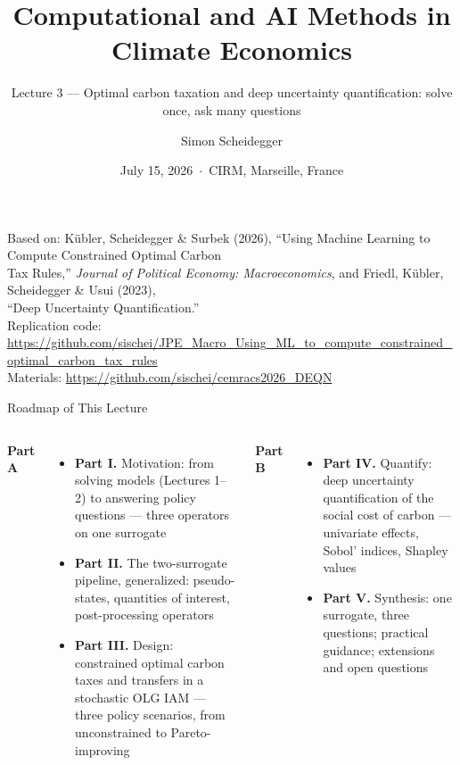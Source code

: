 \documentclass[aspectratio=169,11pt]{beamer}
\title[CEMRACS 2026 $\cdot$ Optimal Taxation \& Deep UQ]
{Computational and AI Methods in Climate Economics}
\subtitle{Lecture 3 --- Optimal carbon taxation and deep uncertainty quantification: solve once, ask many questions}
\author{Simon Scheidegger}
\institute[HEC Lausanne]{HEC Lausanne $\cdot$ Grantham Research Institute, LSE}
\date{July 15, 2026 \,$\cdot$\, CIRM, Marseille, France}
\newcommand{\emphc}[1]{\textcolor{harvardcrimson}{#1}}
\begin{document}

{
\begin{frame}
\titlepage
\vspace{-0.75cm}
\begin{center}
{\scriptsize Based on: K\"ubler, Scheidegger \& Surbek (2026), ``Using Machine Learning to Compute Constrained Optimal Carbon\\
Tax Rules,'' \emph{Journal of Political Economy: Macroeconomics}, and Friedl, K\"ubler, Scheidegger \& Usui (2023),\\
``Deep Uncertainty Quantification.''}\\[3pt]
{\scriptsize Replication code: \url{https://github.com/sischei/JPE_Macro_Using_ML_to_compute_constrained_optimal_carbon_tax_rules}}\\[2pt]
{\scriptsize Materials: \url{https://github.com/sischei/cemracs2026_DEQN}}
\end{center}
\end{frame}
}

\begin{frame}{Roadmap of This Lecture}
\vspace{0.2em}
\begin{columns}[T]
\textbf{Part A}
\begin{itemize}
    \item \textbf{Part I.} Motivation: from solving models (Lectures 1--2) to answering policy questions --- three operators on one surrogate
    \item \textbf{Part II.} The two-surrogate pipeline, generalized: pseudo-states, quantities of interest, post-processing operators
    \item \textbf{Part III.} \emphc{Design}: constrained optimal carbon taxes and transfers in a stochastic OLG IAM --- three policy scenarios, from unconstrained to Pareto-improving
\end{itemize}

\textbf{Part B}
\begin{itemize}
    \item \textbf{Part IV.} \emphc{Quantify}: deep uncertainty quantification of the social cost of carbon --- univariate effects, Sobol' indices, Shapley values
    \item \textbf{Part V.} Synthesis: one surrogate, three questions; practical guidance; extensions and open questions
\end{itemize}
\end{columns}
\end{frame}
\end{document}
